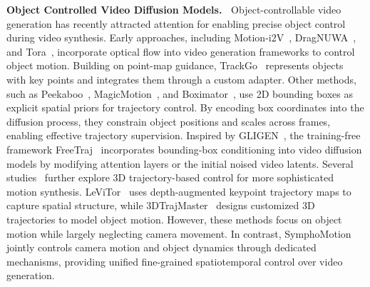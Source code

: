 \vspace{3mm}
\noindent \textbf{Object Controlled Video Diffusion Models.~}
Object-controllable video generation has recently attracted attention for enabling precise object control during video synthesis.
Early approaches, including Motion-i2V~\cite{shi2024motion}, DragNUWA~\cite{yin2023dragnuwa}, and Tora~\cite{zhang2025tora}, incorporate optical flow into video generation frameworks to control object motion.
Building on point-map guidance, TrackGo~\cite{zhou2025trackgo} represents objects with key points and integrates them through a custom adapter.
Other methods, such as Peekaboo~\cite{jain2024peekaboo}, MagicMotion~\cite{li2025magicmotion}, and Boximator~\cite{wang2024boximator}, use 2D bounding boxes as explicit spatial priors for trajectory control. By encoding box coordinates into the diffusion process, they constrain object positions and scales across frames, enabling effective trajectory supervision.
Inspired by GLIGEN~\cite{li2023gligen}, the training-free framework FreeTraj~\cite{qiu2024freetraj} incorporates bounding-box conditioning into video diffusion models by modifying attention layers or the initial noised video latents.
Several studies~\cite{fu20243dtrajmaster,wang2025levitor} further explore 3D trajectory-based control for more sophisticated motion synthesis. LeViTor~\cite{wang2025levitor} uses depth-augmented keypoint trajectory maps to capture spatial structure, while 3DTrajMaster~\cite{fu20243dtrajmaster} designs customized 3D trajectories to model object motion.
However, these methods focus on object motion while largely neglecting camera movement. In contrast, SymphoMotion jointly controls camera motion and object dynamics through dedicated mechanisms, providing unified fine-grained spatiotemporal control over video generation.

